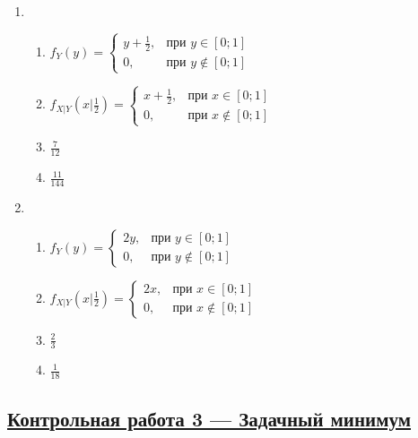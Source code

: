 \begin{multicols}{2}
\begin{enumerate}
\item
\begin{enumerate}
\item $f_{Y}(y) =
\begin{cases} y+\frac{1}{2}, & \text{при } y \in [0;1] \\
0 , & \text{при } y \not\in [0;1]
\end{cases}$
\item $f_{X|Y}(x|\frac{1}{2}) =
\begin{cases} x+\frac{1}{2}, & \text{при } x \in [0;1] \\
0 , & \text{при } x \not\in [0;1]
\end{cases}$
\item $\frac{7}{12}$
\item $\frac{11}{144}$
\end{enumerate}

\item
\begin{enumerate}
\item $f_{Y}(y) =
\begin{cases} 2y, & \text{при } y \in [0;1] \\
0 , & \text{при } y \not\in [0;1]
\end{cases}$
\item $f_{X|Y}(x|\frac{1}{2}) =
\begin{cases} 2x, & \text{при } x \in [0;1] \\
0 , & \text{при } x \not\in [0;1]
\end{cases}$
\item $\frac{2}{3}$
\item $\frac{1}{18}$
\end{enumerate}
\end{enumerate}
\end{multicols}



\subsection[Кр 3]{\hyperref[sec:minimum_kr_03]{Контрольная работа 3 — Задачный минимум}}
\label{sec:sol_minimum_kr_03}


